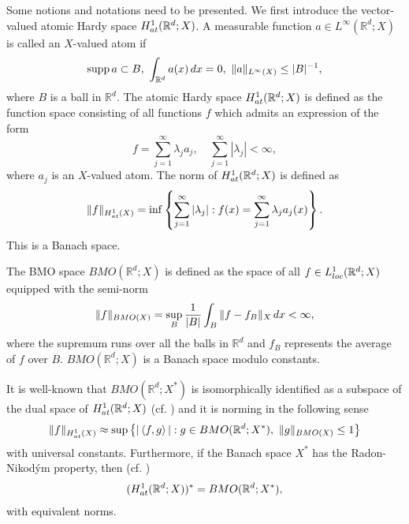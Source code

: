 \documentclass[oneside,english,a4wide]{amsart}
\numberwithin{equation}{section}
\numberwithin{figure}{section}
\theoremstyle{plain}
\theoremstyle{plain}
\theoremstyle{definition}
\theoremstyle{plain}
\theoremstyle{remark}
\theoremstyle{definition}
\theoremstyle{remark}
\theoremstyle{definition}
\newcommand{\real}{{\mathbb R}}
\newcommand{\e}{\varepsilon}
\newcommand{\8}{+\infty}
\renewcommand{\1}{\mathbbm{1}}
\newcommand\norm[1]{ \left\| #1 \right\| }
\newcommand\lk[1]{ \left\{ #1 \right\} }
\newcommand{\lara}[1]{\left\langle #1 \right\rangle}
\newcommand\supp{\text{supp}}
\renewcommand\d{{\rm d}}
\newcommand{\at}{{\rm at}}
\begin{document}
{Some notions and notations need to be presented.
We first introduce the vector-valued atomic Hardy space $H^1_{\at}(\real^d; X)$. A measurable function $a\in L^{\infty}(\real^d; X)$ is called an $X$-valued atom if 
\[
    \supp\, a \subset B, \ \int_{\real^d} a(x) \,\d x = 0,\ \| a \|_{L^{\infty}(X)} \leq |B|^{-1},
\]
where $B$ is a ball in $\real^d$. The atomic Hardy space $H^1_{\at}(\real^d; X)$ is defined as the function space consisting of all functions $f$ which admits an expression of the form
\[
    f = \sum_{j =1}^{\infty}\lambda_ja_j, \quad \sum_{j =1}^{\infty} |\lambda_j| < \infty,
\]
where $a_j$ is an $X$-valued atom. The norm of $H^1_{\at}(\real^d; X)$ is defined as
\[  
    \| f \|_{H^1_{\at}(X)} = \inf\lk{ \sum_{j =1}^{\infty} |\lambda_j|: f(x) = \sum_{j =1}^{\infty} \lambda_ja_j(x) }.
\]
This is a Banach space.

The BMO space $BMO(\real^d; X)$ is defined as the space of all $f \in L^1_{{\rm loc}}(\real^d; X)$ equipped with the semi-norm
\[
    \| f \|_{BMO(X)} = \sup_{B} \frac{1}{|B|}\int_B \| f - f_B \|_X \,\d x < \infty,
\]
where the supremum runs over all the balls in $\real^d$ and $f_B$ represents the average of $f$ over $B$. $BMO(\real^d; X)$ is a Banach space modulo constants.

It is well-known that $BMO(\real^d; X^*)$ is isomorphically identified as a subspace of the dual space of $H^1_{\at}(\real^d; X)$ (cf. \cite{Bourgain1986}) and it is norming in the following sense 
\[
    \| f \|_{H^1_{\at}(X)} \approx \sup\lk{ |\lara{f, g}| : g \in BMO(\real^d; X^*),\ \| g \|_{BMO(X)}\leq 1 }
\]
with universal constants. Furthermore, if the Banach space $X^*$ has the Radon-Nikod{\'y}m property, then (cf. \cite{Blasco1988})
\begin{align}\label{dualatomic}
    (H^1_{\at}(\real^d; X))^* = BMO(\real^d; X^*),
\end{align}
with equivalent norms.



}
\end{document}

